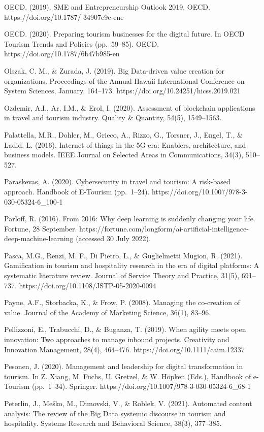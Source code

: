 \documentclass[
  letterpaper,
  DIV=11,
  numbers=noendperiod]{scrreprt}
\begin{document}
OECD. (2019). SME and Entrepreneurship Outlook 2019. OECD.
https://doi.org/10.1787/ 34907e9c-ene

OECD. (2020). Preparing tourism businesses for the digital future. In
OECD Tourism Trends and Policies (pp.~59--85). OECD.
https://doi.org/10.1787/6b47b985-en

Olszak, C. M., \& Zurada, J. (2019). Big Data-driven value creation for
organizations. Proceedings of the Annual Hawaii International Conference
on System Sciences, January, 164--173.
https://doi.org/10.24251/hicss.2019.021

Ozdemir, A.I., Ar, I.M., \& Erol, I. (2020). Assessment of blockchain
applications in travel and tourism industry. Quality \& Quantity, 54(5),
1549--1563.

Palattella, M.R., Dohler, M., Grieco, A., Rizzo, G., Torsner, J., Engel,
T., \& Ladid, L. (2016). Internet of things in the 5G era: Enablers,
architecture, and business models. IEEE Journal on Selected Areas in
Communications, 34(3), 510--527.

Paraskevas, A. (2020). Cybersecurity in travel and tourism: A risk-based
approach. Handbook of E-Tourism (pp.~1--24).
https://doi.org/10.1007/978-3-030-05324-6\_100-1

Parloff, R. (2016). From 2016: Why deep learning is suddenly changing
your life. Fortune, 28 September.
https://fortune.com/longform/ai-artificial-intelligence-deep-machine-learning
(accessed 30 July 2022).

Pasca, M.G., Renzi, M. F., Di Pietro, L., \& Guglielmetti Mugion, R.
(2021). Gamification in tourism and hospitality research in the era of
digital platforms: A systematic literature review. Journal of Service
Theory and Practice, 31(5), 691--737.
https://doi.org/10.1108/JSTP-05-2020-0094

Payne, A.F., Storbacka, K., \& Frow, P. (2008). Managing the co-creation
of value. Journal of the Academy of Marketing Science, 36(1), 83--96.

Pellizzoni, E., Trabucchi, D., \& Buganza, T. (2019). When agility meets
open innovation: Two approaches to manage inbound projects. Creativity
and Innovation Management, 28(4), 464--476.
https://doi.org/10.1111/caim.12337

Pesonen, J. (2020). Management and leadership for digital transformation
in tourism. In Z. Xiang, M. Fuchs, U. Gretzel, \& W. Höpken (Eds.),
Handbook of e-Tourism (pp.~1--34). Springer.
https://doi.org/10.1007/978-3-030-05324-6\_68-1

Peterlin, J., Meško, M., Dimovski, V., \& Roblek, V. (2021). Automated
content analysis: The review of the Big Data systemic discourse in
tourism and hospitality. Systems Research and Behavioral Science, 38(3),
377--385.
\end{document}
